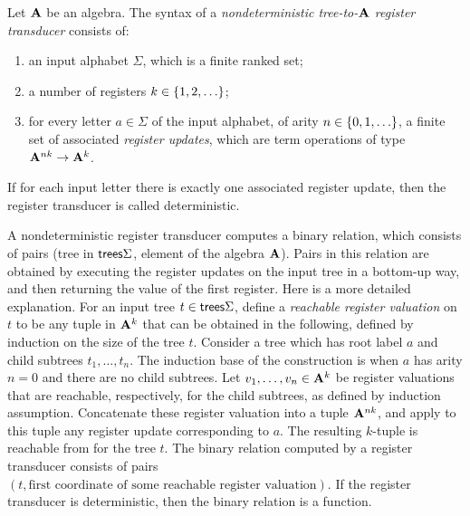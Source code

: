 \begin{definition} Let $\mathbf{A}$ be an algebra. The syntax of a  \emph{nondeterministic tree-to-$\mathbf{A}$ register transducer} consists of:
    \begin{enumerate}
        \item an input alphabet $\Sigma$, which is a finite ranked set;
        \item a number of registers $k \in \{1,2,\ldots\}$;
        \item for every letter $a \in \Sigma$ of the input alphabet, of arity $n \in \{0,1,\ldots\}$, a finite set of  associated \emph{register updates}, which are  term operations of type  $\mathbf{A}^{nk} \to \mathbf{A}^k$. 
    \end{enumerate}
    If for each input letter there is exactly one associated register update, then the register transducer is called deterministic. 
\end{definition}


A nondeterministic register transducer computes a binary relation, which consists of pairs (tree in ${\mathsf{trees}} \Sigma$, element of the algebra $\mathbf{A}$). Pairs in this relation are obtained by  executing the register updates on the input tree in a bottom-up way, and then returning the value of the first register. Here is a more detailed explanation.  For an input  tree $t \in {\mathsf{trees}} \Sigma$, define a \emph{reachable register valuation} on $t$ to be any tuple in $\mathbf{A}^k$ that  can be obtained in the following, defined by  induction on the size of the tree $t$. Consider a tree which has root label $a$ and child subtrees $t_1,\ldots,t_n$. The induction base of the construction is when $a$ has arity $n=0$ and there are no child subtrees. Let $v_1,\ldots,v_n \in \mathbf{A}^k$ be  register valuations that are reachable, respectively,  for the child subtrees, as defined by induction assumption. Concatenate these register valuation into a tuple $\mathbf{A}^{nk}$, and apply to this tuple any register update corresponding to $a$. The resulting $k$-tuple is reachable from for the tree $t$. The binary relation computed by a register transducer consists of pairs $(t,\text{first coordinate of some reachable register valuation})$. If the register transducer is deterministic, then the binary relation is a function. 

